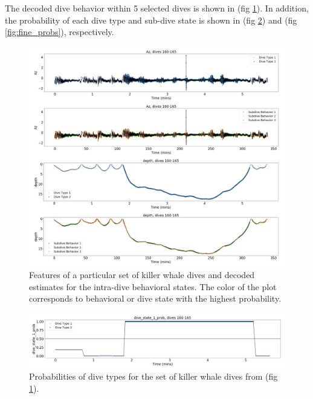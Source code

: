 The decoded dive behavior within 5 selected dives is shown in (fig \ref{fig:labeled_dives}). In addition, the probability of each dive type and sub-dive state is shown in (fig \ref{fig:coarse_probs}) and (fig \ref{fig:fine_probs}), respectively.

\begin{figure}[ht]
	\centering
	\includegraphics[width=5in]{../Plots/labeled_dives.png}
	\caption{Features of a particular set of killer whale dives and decoded estimates for the intra-dive behavioral states. The color of the plot corresponds to behavioral or dive state with the highest probability.}
	\label{fig:labeled_dives}
\end{figure}
%
\begin{figure}[ht]
	\centering
	\includegraphics[width=5in]{../Plots/Coarse_state_probs.png}
	\caption{Probabilities of dive types for the set of killer whale dives from (fig \ref{fig:labeled_dives}).}
	\label{fig:coarse_probs}
\end{figure}
%
